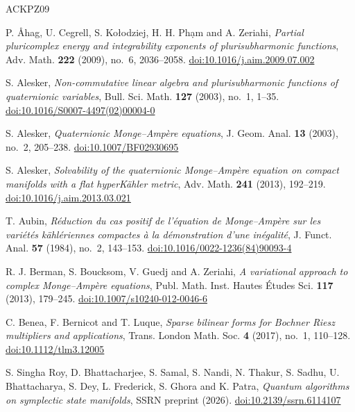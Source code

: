\begin{thebibliography}{ACKPZ09}\small

 P. {\AA}hag, U. Cegrell, S. Ko{\l}odziej, H. H. Ph\d{a}m and A. Zeriahi, \emph{Partial pluricomplex energy and integrability exponents of plurisubharmonic functions}, Adv. Math. \textbf{222} (2009), no.~6, 2036--2058. \href{https://doi.org/10.1016/j.aim.2009.07.002}{doi:10.1016/j.aim.2009.07.002}

 S. Alesker, \emph{Non-commutative linear algebra and plurisubharmonic functions of quaternionic variables}, Bull. Sci. Math. \textbf{127} (2003), no.~1, 1--35. \href{https://doi.org/10.1016/S0007-4497(02)00004-0}{doi:10.1016/S0007-4497(02)00004-0}

 S. Alesker, \emph{Quaternionic Monge--Amp\`ere equations}, J. Geom. Anal. \textbf{13} (2003), no.~2, 205--238. \href{https://doi.org/10.1007/BF02930695}{doi:10.1007/BF02930695}

 S. Alesker, \emph{Solvability of the quaternionic Monge--Amp\`ere equation on compact manifolds with a flat hyperK\"ahler metric}, Adv. Math. \textbf{241} (2013), 192--219. \href{https://doi.org/10.1016/j.aim.2013.03.021}{doi:10.1016/j.aim.2013.03.021}

 T. Aubin, \emph{R\'eduction du cas positif de l'\'equation de Monge--Amp\`ere sur les vari\'et\'es k\"ahl\'eriennes compactes \`a la d\'emonstration d'une in\'egalit\'e}, J. Funct. Anal. \textbf{57} (1984), no.~2, 143--153. \href{https://doi.org/10.1016/0022-1236(84)90093-4}{doi:10.1016/0022-1236(84)90093-4}

 R. J. Berman, S. Boucksom, V. Guedj and A. Zeriahi, \emph{A variational approach to complex Monge--Amp\`ere equations}, Publ. Math. Inst. Hautes \'Etudes Sci. \textbf{117} (2013), 179--245. \href{https://doi.org/10.1007/s10240-012-0046-6}{doi:10.1007/s10240-012-0046-6}

 C. Benea, F. Bernicot and T. Luque, \emph{Sparse bilinear forms for Bochner Riesz multipliers and applications}, Trans. London Math. Soc. \textbf{4} (2017), no.~1, 110--128. \href{https://doi.org/10.1112/tlm3.12005}{doi:10.1112/tlm3.12005}

 S. Singha Roy, D. Bhattacharjee, S. Samal, S. Nandi, N. Thakur, S. Sadhu, U. Bhattacharya, S. Dey, L. Frederick, S. Ghora and K. Patra, \emph{Quantum algorithms on symplectic state manifolds}, SSRN preprint (2026). \href{https://doi.org/10.2139/ssrn.6114107}{doi:10.2139/ssrn.6114107}


\end{thebibliography}
